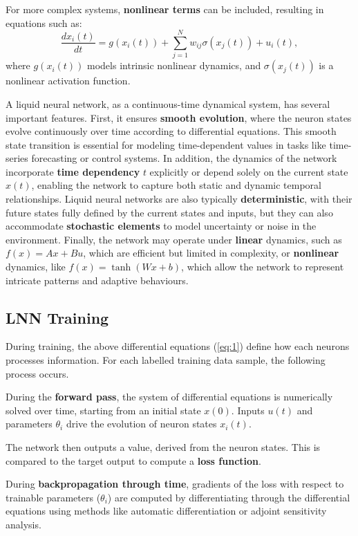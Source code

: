 For more complex systems, \textbf{nonlinear terms} can be included, resulting in equations such as:
\[
\frac{dx_i(t)}{dt} = g(x_i(t)) + \sum_{j=1}^N w_{ij} \sigma(x_j(t)) + u_i(t),
\]
where \(g(x_i(t))\) models intrinsic nonlinear dynamics, and \(\sigma(x_j(t))\) is a nonlinear activation function.

A liquid neural network, as a continuous-time dynamical system, has several important features. First, it ensures \textbf{smooth evolution}, where the neuron states evolve continuously over time according to differential equations. This smooth state transition is essential for modeling time-dependent values in tasks like time-series forecasting or control systems. In addition, the dynamics of the network incorporate \textbf{time dependency} \(t\) explicitly or depend solely on the current state \(x(t)\), enabling the network to capture both static and dynamic temporal relationships. Liquid neural networks are also typically \textbf{deterministic}, with their future states fully defined by the current states and inputs, but they can also accommodate \textbf{stochastic elements} to model uncertainty or noise in the environment. Finally, the network may operate under \textbf{linear} dynamics, such as \(f(x) = Ax + Bu\), which are efficient but limited in complexity, or \textbf{nonlinear} dynamics, like \(f(x) = \tanh(Wx + b)\), which allow the network to represent intricate patterns and adaptive behaviours.

\subsection{LNN Training}
During training, the above differential equations (\ref{eq:1}) define how each neurons processes information. For each labelled training data sample, the following process occurs.

During the \textbf{forward pass}, the system of differential equations is numerically solved over time, starting from an initial state \(x(0)\). Inputs \(u(t)\) and parameters \(\theta_i\) drive the evolution of neuron states \(x_i(t)\).

The network then outputs a value, derived from the neuron states. This is compared to the target output to compute a \textbf{loss function}.

During \textbf{backpropagation through time}, gradients of the loss with respect to trainable parameters (\(\theta_i\)) are computed by differentiating through the differential equations using methods like automatic differentiation or adjoint sensitivity analysis.

